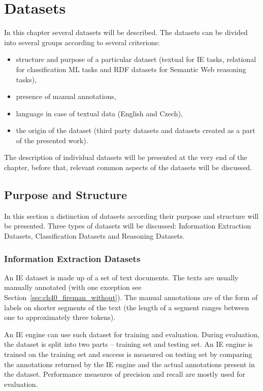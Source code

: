 \chapter{Datasets} \label{sec:ch_data}

\graphicspath{{../img/ch40/}}



In this chapter several datasets will be described. The datasets can be divided into several groups according to several criterions: 
\begin{itemize}
	\item structure and purpose of a particular dataset (textual for IE tasks, relational for classification ML tasks and RDF datasets for Semantic Web reasoning tasks), 
	\item presence of manual annotations,
	\item language in case of textual data (English and Czech), 
	\item the origin of the dataset (third party datasets and datasets created as a part of the presented work).
\end{itemize}
The description of individual datasets will be presented at the very end of the chapter, before that, relevant common aspects of the datasets will be discussed.


\section{Purpose and Structure}
In this section a distinction of datasets according their purpose and structure will be presented. Three types of datasets will be discussed: Information Extraction Datasets, Classification Datasets and Reasoning Datasets.

\subsection{Information Extraction Datasets}
An IE dataset is made up of a set of text documents. The texts are usually manually annotated (with one exception see Section~\ref{sec:ch40_fireman_without}). The manual annotations are of the form of labels on shorter segments of the text (the length of a segment ranges between one to approximately three tokens). 

An IE engine can use such dataset for training and evaluation. During evaluation, the dataset is split into two parts -- training set and testing set. An IE engine is trained on the training set and success is measured on testing set by comparing the annotations returned by the IE engine and the actual annotations present in the dataset.
Performance measures of precision and recall are mostly used for evaluation. 

